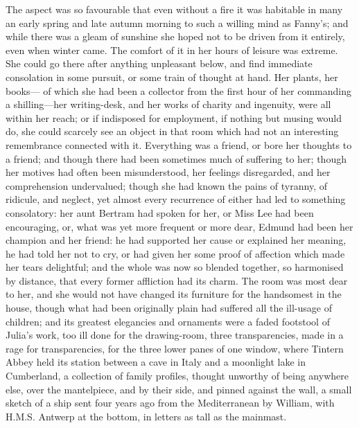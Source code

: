 The aspect was so favourable that even without a fire
it was habitable in many an early spring and late
autumn morning to such a willing mind as Fanny's;
and while there was a gleam of sunshine she hoped not
to be driven from it entirely, even when winter came.
The comfort of it in her hours of leisure was extreme.
She could go there after anything unpleasant below,
and find immediate consolation in some pursuit,
or some train of thought at hand.  Her plants, her books---%
of which she had been a collector from the first hour
of her commanding a shilling---her writing-desk, and her
works of charity and ingenuity, were all within her reach;
or if indisposed for employment, if nothing but musing
would do, she could scarcely see an object in that room
which had not an interesting remembrance connected with it.
Everything was a friend, or bore her thoughts to a friend;
and though there had been sometimes much of suffering
to her; though her motives had often been misunderstood,
her feelings disregarded, and her comprehension undervalued;
though she had known the pains of tyranny, of ridicule,
and neglect, yet almost every recurrence of either had led
to something consolatory:  her aunt Bertram had spoken
for her, or Miss Lee had been encouraging, or, what was yet
more frequent or more dear, Edmund had been her champion
and her friend:  he had supported her cause or explained
her meaning, he had told her not to cry, or had given her
some proof of affection which made her tears delightful;
and the whole was now so blended together, so harmonised
by distance, that every former affliction had its charm.
The room was most dear to her, and she would not have
changed its furniture for the handsomest in the house,
though what had been originally plain had suffered all
the ill-usage of children; and its greatest elegancies
and ornaments were a faded footstool of Julia's work,
too ill done for the drawing-room, three transparencies,
made in a rage for transparencies, for the three lower
panes of one window, where Tintern Abbey held its station
between a cave in Italy and a moonlight lake in Cumberland,
a collection of family profiles, thought unworthy of being
anywhere else, over the mantelpiece, and by their side,
and pinned against the wall, a small sketch of a ship
sent four years ago from the Mediterranean by William,
with H.M.S. Antwerp at the bottom, in letters as tall as the
mainmast.


